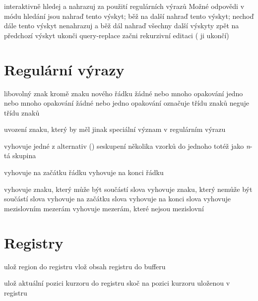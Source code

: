  interaktivně hledej a nahrazuj
 za použití regulárních výrazů
\askip
Možné odpovědi v módu hledání jsou
\askip
{} nahraď tento výskyt; běž na další
\key{,} nahraď tento výskyt; nechoď dále
 tento výskyt nenahrazuj a běž dál
\key{!} nahraď všechny další výskyty
\key{\^{}} zpět na předchozí výskyt
 ukonči query-replace
 začni rekurzivní editaci ( ji ukončí)

\section{Regulární výrazy}

 libovolný znak kromě znaku nového řádku
\key{*} žádné nebo mnoho opakování
\key{+} jedno nebo mnoho opakování
 žádné nebo jedno opakování
\key{[$\ldots$]} označuje třídu znaků
\key{[\^{}$\ldots$]} neguje třídu znaků

 uvození znaku, který by měl jinak speciální význam v
regulárním výrazu

\key{$\ldots$\\|$\ldots$\\|$\ldots$} vyhovuje jedné z alternativ ()
\key{\\( $\ldots$ \\)} seskupení několika vzorků do jednoho
 totéž jako {\it n\/}-tá skupina

\key{\^{}} vyhovuje na začátku řádku
\key{\$} vyhovuje na konci řádku

\key{\\w} vyhovuje znaku, který může být součástí slova
\key{\\W} vyhovuje znaku, který nemůže být součástí slova
\key{\\<} vyhovuje na začátku slova
\key{\\>} vyhovuje na konci slova
\key{\\b} vyhovuje mezislovním mezerám
\key{\\B} vyhovuje mezerám, které nejsou mezislovní

\section{Registry}

 ulož region do registru
 vlož obsah registru do bufferu

 ulož aktuální pozici kurzoru do registru
 skoč na pozici kurzoru uloženou v registru

